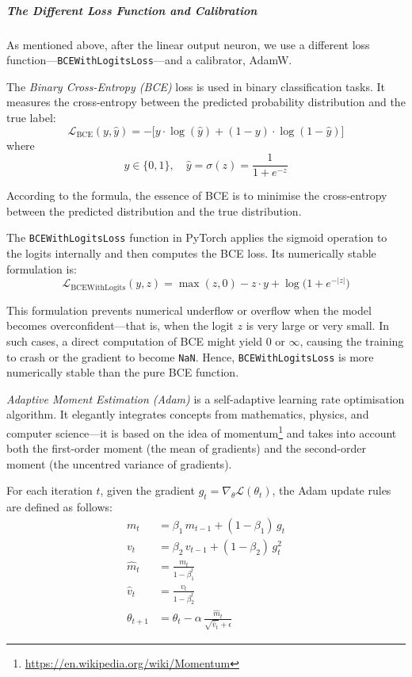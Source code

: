 \documentclass[12pt]{article}
\begin{document}
\subparagraph{The Different Loss Function and Calibration}

As mentioned above, after the linear output neuron, we use a different loss function\;---\;\texttt{BCEWithLogitsLoss}\;---\;and a calibrator, AdamW\cite{paszke2019pytorch,loshchilov2019adamw}.

The \textit{Binary Cross-Entropy (BCE)} loss is used in binary classification tasks. It measures the cross-entropy between the predicted probability distribution and the true label:
\begin{equation}
\mathcal{L}_{\mathrm{BCE}}(y, \hat{y}) = - \big[ y \cdot \log(\hat{y}) + (1 - y) \cdot \log(1 - \hat{y}) \big]
\end{equation}
where
\begin{equation}
y \in \{0, 1\}, \quad \hat{y} = \sigma(z) = \frac{1}{1 + e^{-z}}
\end{equation}

According to the formula, the essence of BCE is to minimise the cross-entropy between the predicted distribution and the true distribution.

The \texttt{BCEWithLogitsLoss} function in PyTorch applies the sigmoid operation to the logits internally and then computes the BCE loss. Its numerically stable formulation is:
\begin{equation}
\mathcal{L}_{\mathrm{BCEWithLogits}}(y, z) = \max(z, 0) - z \cdot y + \log\big(1 + e^{-|z|}\big)
\end{equation}

This formulation prevents numerical underflow or overflow when the model becomes overconfident\;---\;that is, when the logit $z$ is very large or very small. In such cases, a direct computation of BCE might yield $0$ or $\infty$, causing the training to crash or the gradient to become \texttt{NaN}. Hence, \texttt{BCEWithLogitsLoss} is more numerically stable than the pure BCE function.

\textit{Adaptive Moment Estimation (Adam)} is a self-adaptive learning rate optimisation algorithm\cite{kingma2014adam}. It elegantly integrates concepts from mathematics, physics, and computer science\;---\;it is based on the idea of momentum\footnote{\url{https://en.wikipedia.org/wiki/Momentum}} and takes into account both the first-order moment (the mean of gradients) and the second-order moment (the uncentred variance of gradients).

For each iteration $t$, given the gradient $g_t = \nabla_\theta \mathcal{L}(\theta_t)$,  
the Adam update rules are defined as follows:
\begin{equation}
\begin{aligned}
m_t &= \beta_1 \, m_{t-1} + (1 - \beta_1) \, g_t \\
v_t &= \beta_2 \, v_{t-1} + (1 - \beta_2) \, g_t^2 \\
\hat{m}_t &= \frac{m_t}{1 - \beta_1^t} \\
\hat{v}_t &= \frac{v_t}{1 - \beta_2^t} \\
\theta_{t+1} &= \theta_t - \alpha \, \frac{\hat{m}_t}{\sqrt{\hat{v}_t} + \epsilon}
\end{aligned}
\end{equation}
\end{document}

